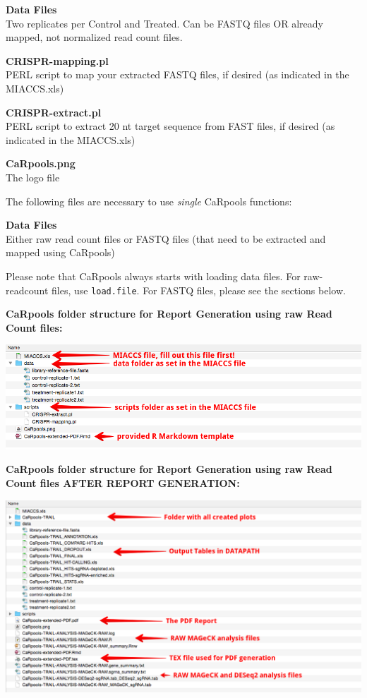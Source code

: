 \documentclass[]{article}
\begin{document}
\textbf{Data Files}\\
Two replicates per Control and Treated. Can be FASTQ files OR already
mapped, not normalized read count files.

\textbf{CRISPR-mapping.pl}\\
PERL script to map your extracted FASTQ files, if desired (as indicated
in the MIACCS.xls)

\textbf{CRISPR-extract.pl}\\
PERL script to extract 20 nt target sequence from FAST files, if desired
(as indicated in the MIACCS.xls)

\textbf{CaRpools.png}\\
The logo file

The following files are necessary to use \emph{single} CaRpools
functions:

\textbf{Data Files}\\
Either raw read count files or FASTQ files (that need to be extracted
and mapped using CaRpools)

Please note that CaRpools always starts with loading data files. For
raw-readcount files, use \texttt{load.file}. For FASTQ files, please see
the sections below.

\textbf{CaRpools folder structure for Report Generation using raw Read
Count files:}

\includegraphics{./pictures/folder-structure-before.png}

\textbf{CaRpools folder structure for Report Generation using raw Read
Count files AFTER REPORT GENERATION:}

\includegraphics{./pictures/folder-structure-FINAL.png}
\end{document}

